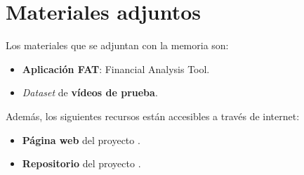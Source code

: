 \section{Materiales adjuntos}\label{materiales-adjuntos}

Los materiales que se adjuntan con la memoria son: 

\begin{itemize}
\tightlist
\item
	\textbf{Aplicación FAT}: Financial Analysis Tool.
\item	
	\emph{Dataset} de \textbf{vídeos de prueba}.
\end{itemize}

Además, los siguientes recursos están accesibles a través de internet:

\begin{itemize}
\tightlist
\item
  \textbf{Página web} del proyecto \citep{FAT:web}.
\item
  \textbf{Repositorio} del proyecto \citep{FAT:repo}.
\end{itemize}


